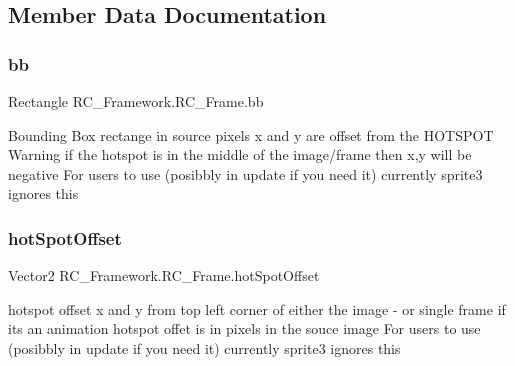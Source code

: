 \subsection{Member Data Documentation}
\mbox{\label{class_r_c___framework_1_1_r_c___frame_a3da33fc90486a672115df3764898b808}} 
\subsubsection{\texorpdfstring{bb}{bb}}
{\footnotesize\ttfamily Rectangle R\+C\+\_\+\+Framework.\+R\+C\+\_\+\+Frame.\+bb}



Bounding Box rectange in source pixels x and y are offset from the H\+O\+T\+S\+P\+OT Warning if the hotspot is in the middle of the image/frame then x,y will be negative For users to use (posibbly in update if you need it) currently sprite3 ignores this 

\mbox{\label{class_r_c___framework_1_1_r_c___frame_a3188c8af00f675e9419b492d4ef40587}} 
\subsubsection{\texorpdfstring{hot\+Spot\+Offset}{hotSpotOffset}}
{\footnotesize\ttfamily Vector2 R\+C\+\_\+\+Framework.\+R\+C\+\_\+\+Frame.\+hot\+Spot\+Offset}



hotspot offset x and y from top left corner of either the image -\/ or single frame if its an animation hotspot offet is in pixels in the souce image For users to use (posibbly in update if you need it) currently sprite3 ignores this 

\mbox{\label{class_r_c___framework_1_1_r_c___frame_a0e325c29407bc7c18acbbe841095a89a}} 
